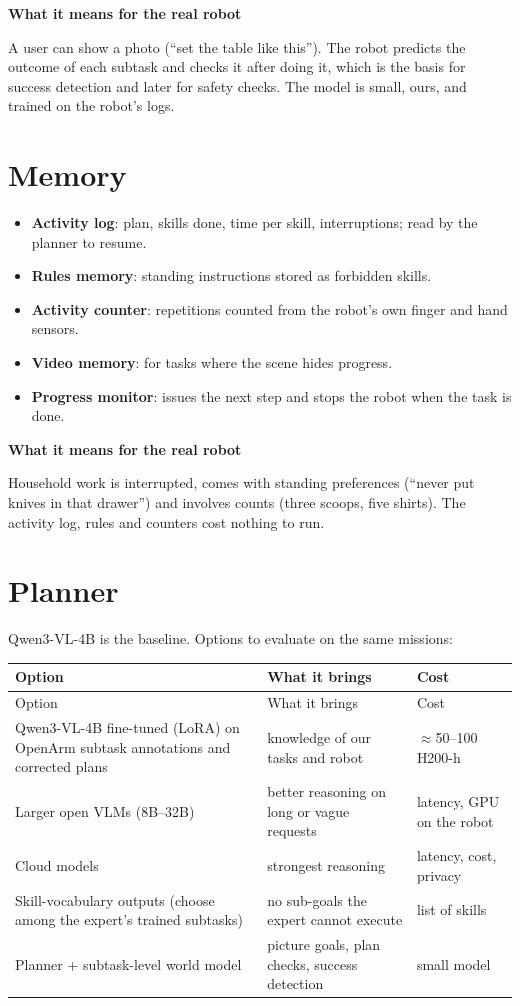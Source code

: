 \documentclass[11pt,a4paper]{article}
\newcommand{\sub}[1]{\par\needspace{4\baselineskip}\smallskip\noindent\textbf{#1}\par}
\begin{document}
\sub{What it means for the real robot}
A user can show a photo (``set the table like this''). The robot predicts the outcome of each subtask and checks it after doing it, which is the basis for success detection and later for safety checks. The model is small, ours, and trained on the robot's logs.

\section{Memory}
\label{sec:prop-mem}
\begin{itemize}
\item \textbf{Activity log}: plan, skills done, time per skill, interruptions; read by the planner to resume.
\item \textbf{Rules memory}: standing instructions stored as forbidden skills.
\item \textbf{Activity counter}: repetitions counted from the robot's own finger and hand sensors.
\item \textbf{Video memory}: for tasks where the scene hides progress.
\item \textbf{Progress monitor}: issues the next step and stops the robot when the task is done.
\end{itemize}

\sub{What it means for the real robot}
Household work is interrupted, comes with standing preferences (``never put knives in that drawer'') and involves counts (three scoops, five shirts). The activity log, rules and counters cost nothing to run.

\section{Planner}
\label{sec:prop-plan}
Qwen3-VL-4B is the baseline. Options to evaluate on the same missions:
{\small
\begin{xltabular}{\textwidth}{P{4.6cm}YP{3.0cm}}
\toprule
Option & What it brings & Cost \\
\midrule
\endfirsthead
\toprule
Option & What it brings & Cost \\
\midrule
\endhead
Qwen3-VL-4B fine-tuned (LoRA) on OpenArm subtask annotations and corrected plans & knowledge of our tasks and robot & $\approx$50--100 H200-h \\
Larger open VLMs (8B--32B) & better reasoning on long or vague requests & latency, GPU on the robot \\
Cloud models & strongest reasoning & latency, cost, privacy \\
Skill-vocabulary outputs (choose among the expert's trained subtasks) & no sub-goals the expert cannot execute & list of skills \\
Planner + subtask-level world model & picture goals, plan checks, success detection & small model \\
\bottomrule
\end{xltabular}}
\end{document}
